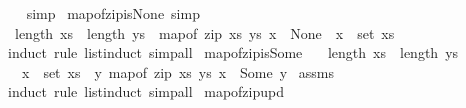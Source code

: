 \begin{isabellebody}
%
\isadelimproof
\ \ %
\endisadelimproof
%
\isatagproof
{}\isamarkupfalse%
\ simp%
\endisatagproof
{\isafoldproof}%
%
\isadelimproof
\isanewline
%
\endisadelimproof
\isanewline
{}\isamarkupfalse%
\ map{\isacharunderscore}{\kern0pt}of{\isacharunderscore}{\kern0pt}zip{\isacharunderscore}{\kern0pt}is{\isacharunderscore}{\kern0pt}None\ {\isacharbrackleft}{\kern0pt}simp{\isacharbrackright}{\kern0pt}{\isacharcolon}{\kern0pt}\isanewline
\ \ {\isachardoublequoteopen}length\ xs\ {\isacharequal}{\kern0pt}\ length\ ys\ {\isasymLongrightarrow}\ {\isacharparenleft}{\kern0pt}map{\isacharunderscore}{\kern0pt}of\ {\isacharparenleft}{\kern0pt}zip\ xs\ ys{\isacharparenright}{\kern0pt}\ x\ {\isacharequal}{\kern0pt}\ None{\isacharparenright}{\kern0pt}\ {\isacharequal}{\kern0pt}\ {\isacharparenleft}{\kern0pt}x\ {\isasymnotin}\ set\ xs{\isacharparenright}{\kern0pt}{\isachardoublequoteclose}\isanewline
%
\isadelimproof
%
\endisadelimproof
%
\isatagproof
{}\isamarkupfalse%
\ {\isacharparenleft}{\kern0pt}induct\ rule{\isacharcolon}{\kern0pt}\ list{\isacharunderscore}{\kern0pt}induct{}{\isacharparenright}{\kern0pt}\ simp{\isacharunderscore}{\kern0pt}all%
\endisatagproof
{\isafoldproof}%
%
\isadelimproof
\isanewline
%
\endisadelimproof
\isanewline
{}\isamarkupfalse%
\ map{\isacharunderscore}{\kern0pt}of{\isacharunderscore}{\kern0pt}zip{\isacharunderscore}{\kern0pt}is{\isacharunderscore}{\kern0pt}Some{\isacharcolon}{\kern0pt}\isanewline
\ \ \ {\isachardoublequoteopen}length\ xs\ {\isacharequal}{\kern0pt}\ length\ ys{\isachardoublequoteclose}\isanewline
\ \ \ {\isachardoublequoteopen}x\ {\isasymin}\ set\ xs\ {\isasymlongleftrightarrow}\ {\isacharparenleft}{\kern0pt}{\isasymexists}y{\isachardot}{\kern0pt}\ map{\isacharunderscore}{\kern0pt}of\ {\isacharparenleft}{\kern0pt}zip\ xs\ ys{\isacharparenright}{\kern0pt}\ x\ {\isacharequal}{\kern0pt}\ Some\ y{\isacharparenright}{\kern0pt}{\isachardoublequoteclose}\isanewline
%
\isadelimproof
%
\endisadelimproof
%
\isatagproof
{}\isamarkupfalse%
\ assms\ \isamarkupfalse%
\ {\isacharparenleft}{\kern0pt}induct\ rule{\isacharcolon}{\kern0pt}\ list{\isacharunderscore}{\kern0pt}induct{}{\isacharparenright}{\kern0pt}\ simp{\isacharunderscore}{\kern0pt}all%
\endisatagproof
{\isafoldproof}%
%
\isadelimproof
\isanewline
%
\endisadelimproof
\isanewline
{}\isamarkupfalse%
\ map{\isacharunderscore}{\kern0pt}of{\isacharunderscore}{\kern0pt}zip{\isacharunderscore}{\kern0pt}upd{\isacharcolon}{\kern0pt}\isanewline

\end{isabellebody}
